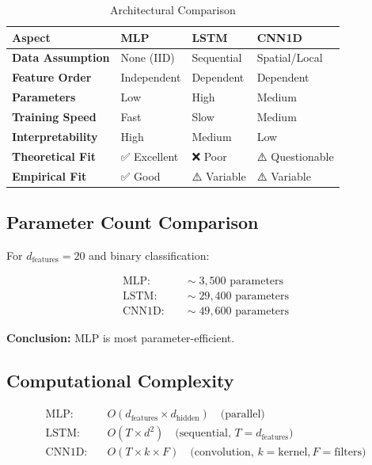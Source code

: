 \documentclass[12pt]{article}
\begin{document}
\begin{table}[h]
\centering
\begin{tabular}{|l|l|l|l|}
\hline
\textbf{Aspect} & \textbf{MLP} & \textbf{LSTM} & \textbf{CNN1D} \\
\hline
\textbf{Data Assumption} & None (IID) & Sequential & Spatial/Local \\
\hline
\textbf{Feature Order} & Independent & Dependent & Dependent \\
\hline
\textbf{Parameters} & Low & High & Medium \\
\hline
\textbf{Training Speed} & Fast & Slow & Medium \\
\hline
\textbf{Interpretability} & High & Medium & Low \\
\hline
\textbf{Theoretical Fit} & ✅ Excellent & ❌ Poor & ⚠️ Questionable \\
\hline
\textbf{Empirical Fit} & ✅ Good & ⚠️ Variable & ⚠️ Variable \\
\hline
\end{tabular}
\caption{Architectural Comparison}
\end{table}

\subsection{Parameter Count Comparison}

For $d_{\text{features}} = 20$ and binary classification:

\begin{align*}
\text{MLP:} &\quad \sim 3,500 \text{ parameters} \\
\text{LSTM:} &\quad \sim 29,400 \text{ parameters} \\
\text{CNN1D:} &\quad \sim 49,600 \text{ parameters}
\end{align*}

\textbf{Conclusion:} MLP is most parameter-efficient.

\subsection{Computational Complexity}

\begin{align*}
\text{MLP:} &\quad O(d_{\text{features}} \times d_{\text{hidden}}) \quad \text{(parallel)} \\
\text{LSTM:} &\quad O(T \times d^2) \quad \text{(sequential, } T = d_{\text{features}}) \\
\text{CNN1D:} &\quad O(T \times k \times F) \quad \text{(convolution, } k = \text{kernel}, F = \text{filters})
\end{align*}
\end{document}
